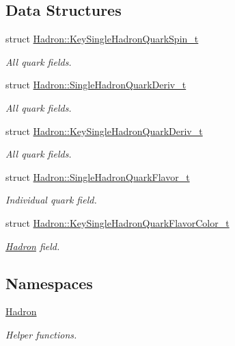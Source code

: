 \subsection*{Data Structures}
\begin{DoxyCompactItemize}
\item 
struct \mbox{\hyperlink{structHadron_1_1KeySingleHadronQuarkSpin__t}{Hadron\+::\+Key\+Single\+Hadron\+Quark\+Spin\+\_\+t}}
\begin{DoxyCompactList}\small\item\em All quark fields. \end{DoxyCompactList}\item 
struct \mbox{\hyperlink{structHadron_1_1SingleHadronQuarkDeriv__t}{Hadron\+::\+Single\+Hadron\+Quark\+Deriv\+\_\+t}}
\begin{DoxyCompactList}\small\item\em All quark fields. \end{DoxyCompactList}\item 
struct \mbox{\hyperlink{structHadron_1_1KeySingleHadronQuarkDeriv__t}{Hadron\+::\+Key\+Single\+Hadron\+Quark\+Deriv\+\_\+t}}
\begin{DoxyCompactList}\small\item\em All quark fields. \end{DoxyCompactList}\item 
struct \mbox{\hyperlink{structHadron_1_1SingleHadronQuarkFlavor__t}{Hadron\+::\+Single\+Hadron\+Quark\+Flavor\+\_\+t}}
\begin{DoxyCompactList}\small\item\em Individual quark field. \end{DoxyCompactList}\item 
struct \mbox{\hyperlink{structHadron_1_1KeySingleHadronQuarkFlavorColor__t}{Hadron\+::\+Key\+Single\+Hadron\+Quark\+Flavor\+Color\+\_\+t}}
\begin{DoxyCompactList}\small\item\em \mbox{\hyperlink{namespaceHadron}{Hadron}} field. \end{DoxyCompactList}\end{DoxyCompactItemize}
\subsection*{Namespaces}
\begin{DoxyCompactItemize}
\item 
 \mbox{\hyperlink{namespaceHadron}{Hadron}}
\begin{DoxyCompactList}\small\item\em Helper functions. \end{DoxyCompactList}\end{DoxyCompactItemize}
